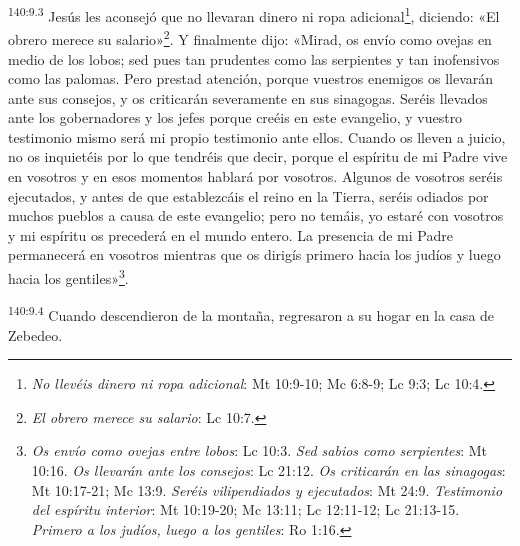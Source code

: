 \par
\textsuperscript{140:9.3} Jesús les aconsejó que no llevaran dinero ni ropa adicional\footnote{\textit{No llevéis dinero ni ropa adicional}: Mt 10:9-10; Mc 6:8-9; Lc 9:3; Lc 10:4.}, diciendo: «El obrero merece su salario»\footnote{\textit{El obrero merece su salario}: Lc 10:7.}. Y finalmente dijo: «Mirad, os envío como ovejas en medio de los lobos; sed pues tan prudentes como las serpientes y tan inofensivos como las palomas. Pero prestad atención, porque vuestros enemigos os llevarán ante sus consejos, y os criticarán severamente en sus sinagogas. Seréis llevados ante los gobernadores y los jefes porque creéis en este evangelio, y vuestro testimonio mismo será mi propio testimonio ante ellos. Cuando os lleven a juicio, no os inquietéis por lo que tendréis que decir, porque el espíritu de mi Padre vive en vosotros y en esos momentos hablará por vosotros. Algunos de vosotros seréis ejecutados, y antes de que establezcáis el reino en la Tierra, seréis odiados por muchos pueblos a causa de este evangelio; pero no temáis, yo estaré con vosotros y mi espíritu os precederá en el mundo entero. La presencia de mi Padre permanecerá en vosotros mientras que os dirigís primero hacia los judíos y luego hacia los gentiles»\footnote{\textit{Os envío como ovejas entre lobos}: Lc 10:3. \textit{Sed sabios como serpientes}: Mt 10:16. \textit{Os llevarán ante los consejos}: Lc 21:12. \textit{Os criticarán en las sinagogas}: Mt 10:17-21; Mc 13:9. \textit{Seréis vilipendiados y ejecutados}: Mt 24:9. \textit{Testimonio del espíritu interior}: Mt 10:19-20; Mc 13:11; Lc 12:11-12; Lc 21:13-15. \textit{Primero a los judíos, luego a los gentiles}: Ro 1:16.}.

\par
\textsuperscript{140:9.4} Cuando descendieron de la montaña, regresaron a su hogar en la casa de Zebedeo.

